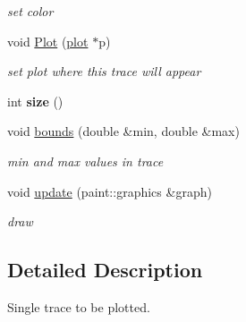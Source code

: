 \begin{DoxyCompactItemize}
\begin{DoxyCompactList}\small\item\em set color \end{DoxyCompactList}\item 
\hypertarget{classnana_1_1plot_1_1trace_a0536b5fae95bf9b85c94bddce71511fe}{void \hyperlink{classnana_1_1plot_1_1trace_a0536b5fae95bf9b85c94bddce71511fe}{Plot} (\hyperlink{classnana_1_1plot_1_1plot}{plot} $\ast$p)}\label{classnana_1_1plot_1_1trace_a0536b5fae95bf9b85c94bddce71511fe}

\begin{DoxyCompactList}\small\item\em set plot where this trace will appear \end{DoxyCompactList}\item 
\hypertarget{classnana_1_1plot_1_1trace_af4bff91b067ae89bab62568e4e2843fd}{int {\bfseries size} ()}\label{classnana_1_1plot_1_1trace_af4bff91b067ae89bab62568e4e2843fd}

\item 
\hypertarget{classnana_1_1plot_1_1trace_ae430b49df4b1702b9fba6fe0bf61fb39}{void \hyperlink{classnana_1_1plot_1_1trace_ae430b49df4b1702b9fba6fe0bf61fb39}{bounds} (double \&min, double \&max)}\label{classnana_1_1plot_1_1trace_ae430b49df4b1702b9fba6fe0bf61fb39}

\begin{DoxyCompactList}\small\item\em min and max values in trace \end{DoxyCompactList}\item 
\hypertarget{classnana_1_1plot_1_1trace_ab81fca07778b6922d9f44b84bb6fb437}{void \hyperlink{classnana_1_1plot_1_1trace_ab81fca07778b6922d9f44b84bb6fb437}{update} (paint\-::graphics \&graph)}\label{classnana_1_1plot_1_1trace_ab81fca07778b6922d9f44b84bb6fb437}

\begin{DoxyCompactList}\small\item\em draw \end{DoxyCompactList}\end{DoxyCompactItemize}


\subsection{Detailed Description}
Single trace to be plotted. 


